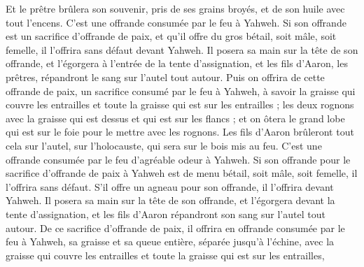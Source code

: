 \begin{multicols}{2}
Et le prêtre brûlera son souvenir, pris de ses grains broyés, et de son huile avec tout l'encens. C'est une offrande consumée par le feu à Yahweh.
\VerseOne{}Si son offrande est un sacrifice d'offrande de paix, et qu'il offre du gros bétail, soit mâle, soit femelle, il l'offrira sans défaut devant Yahweh.
Il posera sa main sur la tête de son offrande, et l'égorgera à l'entrée de la tente d'assignation, et les fils d'Aaron, les prêtres, répandront le sang sur l'autel tout autour.
Puis on offrira de cette offrande de paix, un sacrifice consumé par le feu à Yahweh, à savoir la graisse qui couvre les entrailles et toute la graisse qui est sur les entrailles ;
les deux rognons avec la graisse qui est dessus et qui est sur les flancs ; et on ôtera le grand lobe qui est sur le foie pour le mettre avec les rognons.
Les fils d'Aaron brûleront tout cela sur l'autel, sur l'holocauste, qui sera sur le bois mis au feu. C'est une offrande consumée par le feu d'agréable odeur à Yahweh.
Si son offrande pour le sacrifice d'offrande de paix à Yahweh est de menu bétail, soit mâle, soit femelle, il l'offrira sans défaut.
S'il offre un agneau pour son offrande, il l'offrira devant Yahweh.
Il posera sa main sur la tête de son offrande, et l'égorgera devant la tente d'assignation, et les fils d'Aaron répandront son sang sur l'autel tout autour.
De ce sacrifice d'offrande de paix, il offrira en offrande consumée par le feu à Yahweh, sa graisse et sa queue entière, séparée jusqu'à l'échine, avec la graisse qui couvre les entrailles et toute la graisse qui est sur les entrailles,

\end{multicols}
